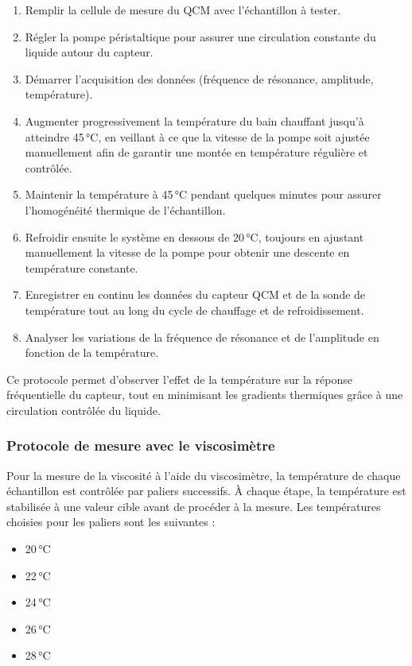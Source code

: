 \begin{enumerate}
    \item Remplir la cellule de mesure du QCM avec l'échantillon à tester.
    \item Régler la pompe péristaltique pour assurer une circulation constante du liquide autour du capteur.
    \item Démarrer l'acquisition des données (fréquence de résonance, amplitude, température).
    \item Augmenter progressivement la température du bain chauffant jusqu'à atteindre 45 °C, en veillant à ce que la vitesse de la pompe soit ajustée manuellement afin de garantir une montée en température régulière et contrôlée.
    \item Maintenir la température à 45 °C pendant quelques minutes pour assurer l'homogénéité thermique de l'échantillon.
    \item Refroidir ensuite le système en dessous de 20 °C, toujours en ajustant manuellement la vitesse de la pompe pour obtenir une descente en température constante.
    \item Enregistrer en continu les données du capteur QCM et de la sonde de température tout au long du cycle de chauffage et de refroidissement.
    \item Analyser les variations de la fréquence de résonance et de l'amplitude en fonction de la température.
\end{enumerate}

Ce protocole permet d'observer l'effet de la température sur la réponse fréquentielle du capteur, tout en minimisant les gradients thermiques grâce à une circulation contrôlée du liquide.

\subsubsection{Protocole de mesure avec le viscosimètre}

Pour la mesure de la viscosité à l'aide du viscosimètre, la température de chaque échantillon est contrôlée par paliers successifs. À chaque étape, la température est stabilisée à une valeur cible avant de procéder à la mesure. Les températures choisies pour les paliers sont les suivantes :
\begin{itemize}
    \item 20 °C
    \item 22 °C
    \item 24 °C
    \item 26 °C
    \item 28 °C
\end{itemize}

